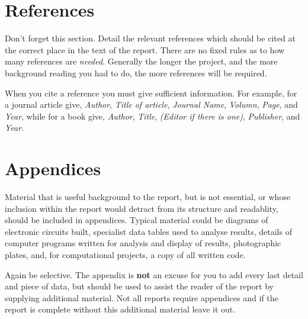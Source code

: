 \documentclass[a4paper,12pt]{article}
\begin{document}
 

\section{References}

Don't forget this section. Detail the relevant references which
should be cited at the correct place in the text of the report. There
are no fixed rules as to how many references are {\it needed}. Generally
the longer the project, and the more background reading you had to do,
the more references will be required. 

When you cite a reference you must give sufficient information. For
example, for a journal article give, {\it Author}, {\it Title of
article},
{\it Journal Name}, {\it Volumn}, {\it Page}, and {\it Year}, 
while for a book give, {\it Author}, {\it Title},
{\it (Editor if there is one)}, {\it Publisher}, and {\it Year}.        
\appendix
\section{Appendices}

Material that is useful background to the report, but is not essential,
or whose inclusion within the report  would detract from its
structure and readablity, should be included in appendices. Typical
material could be diagrams of electronic circuits built, specialist
data tables used to analyse results, details of computer programs
written for analysis and display of results, photographic plates,
and, for computational projects, a copy of all written code.

Again be selective. The appendix is {\bf not} an excuse for you to add every
last detail and piece of data, but should be used to assist the reader
of the report by supplying additional material. Not all reports require
appendices and if the report is complete without this additional
material leave it out.
\end{document}
